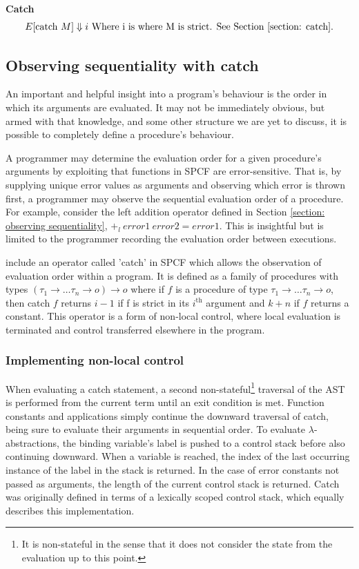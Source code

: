 \documentclass[12pt,a4paper]{report}
\theoremstyle{definition}
\theoremstyle{definition}
\theoremstyle{remark}
\begin{document}
\textbf{Catch}
\begin{equation}
    E[\text{catch}\ M] \Downarrow i \text{ Where i is where M is strict. See Section \ref{section: catch}.}
\end{equation}

\subsection{Observing sequentiality with catch}\label{section: catch}
An important and helpful insight into a program's behaviour is the order in which its arguments are evaluated. It may not be immediately obvious, but armed with that knowledge, and some other structure we are yet to discuss, it is possible to completely define a procedure's behaviour. 

A programmer may determine the evaluation order for a given procedure's arguments by exploiting that functions in SPCF are error-sensitive. That is, by supplying unique error values as arguments and observing which error is thrown first, a programmer may observe the sequential evaluation order of a procedure. For example, consider the left addition operator defined in Section \ref{section: observing sequentiality}, $+_l\ error1\ error2 = error1$. This is insightful but is limited to the programmer recording the evaluation order between executions.

\cite{cartwright_1992} include an operator called 'catch' in SPCF which allows the observation of evaluation order within a program. It is defined as a family of procedures with types $(\tau_1 \rightarrow \dots \tau_n \rightarrow o) \rightarrow o$ where if $f$ is a procedure of type $\tau_1 \rightarrow \dots \tau_n \rightarrow o$, then catch $f$ returns $i - 1$ if f is strict in its $i^{\text{th}}$ argument and $k+n$ if $f$ returns a constant. This operator is a form of non-local control, where local evaluation is terminated and control transferred elsewhere in the program.

\subsubsection{Implementing non-local control}
When evaluating a catch statement, a second non-stateful\footnote{It is non-stateful in the sense that it does not consider the state from the evaluation up to this point.} traversal of the AST is performed from the current term until an exit condition is met. Function constants and applications simply continue the downward traversal of catch, being sure to evaluate their arguments in sequential order. To evaluate $\lambda$-abstractions, the binding variable's label is pushed to a control stack before also continuing downward. When a variable is reached, the index of the last occurring instance of the label in the stack is returned. In the case of error constants not passed as arguments, the length of the current control stack is returned. Catch was originally defined in terms of a lexically scoped control stack, which equally describes this implementation.
\end{document}
